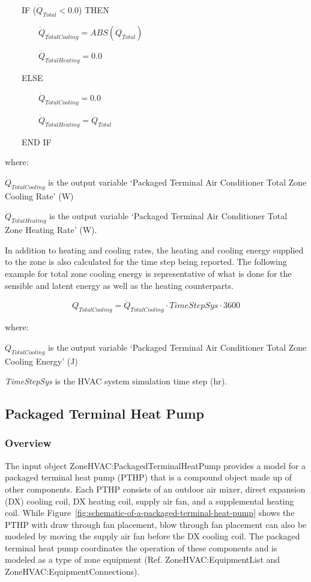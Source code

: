 ~~~~IF (\(\dot{Q}_{Total} < 0.0\)) THEN

~~~~~~~~\(\dot{Q}_{TotalCooling} = ABS(\dot{Q}_{Total})\)

~~~~~~~~\(\dot{Q}_{TotalHeating} = 0.0\)

~~~~ELSE

~~~~~~~~\(\dot{Q}_{TotalCooling} = 0.0\)

~~~~~~~~\(\dot{Q}_{TotalHeating} = \dot{Q}_{Total}\)

~~~~END IF

where:

\(\dot{Q}_{TotalCooling}\) is the output variable `Packaged Terminal Air Conditioner Total Zone Cooling Rate' (W)

\(\dot{Q}_{TotalHeating}\) is the output variable `Packaged Terminal Air Conditioner Total Zone Heating Rate' (W).

In addition to heating and cooling rates, the heating and cooling energy supplied to the zone is also calculated for the time step being reported. The following example for total zone cooling energy is representative of what is done for the sensible and latent energy as well as the heating counterparts.

\begin{equation}
  Q_{TotalCooling} = \dot{Q}_{TotalCooling} \cdot TimeStepSys \cdot 3600
\end{equation}

where:

\(Q_{TotalCooling}\) is the output variable `Packaged Terminal Air Conditioner Total Zone Cooling Energy' (J)

\emph{TimeStepSys} is the HVAC system simulation time step (hr).

\subsection{Packaged Terminal Heat Pump}\label{packaged-terminal-heat-pump}

\subsubsection{Overview}\label{overview-7-001}

The input object ZoneHVAC:PackagedTerminalHeatPump provides a model for a packaged terminal heat pump (PTHP) that is a compound object made up of other components. Each PTHP consists of an outdoor air mixer, direct expansion (DX) cooling coil, DX heating coil, supply air fan, and a supplemental heating coil. While Figure~\ref{fig:schematic-of-a-packaged-terminal-heat-pump} shows the PTHP with draw through fan placement, blow through fan placement can also be modeled by moving the supply air fan before the DX cooling coil. The packaged terminal heat pump coordinates the operation of these components and is modeled as a type of zone equipment (Ref. ZoneHVAC:EquipmentList and ZoneHVAC:EquipmentConnections).

